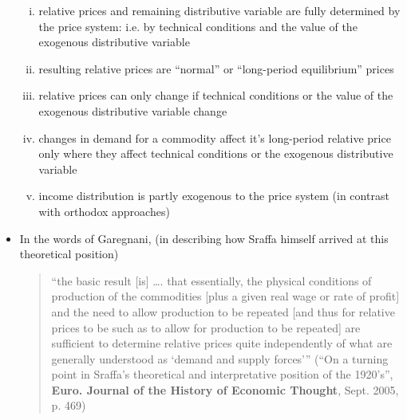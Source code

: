 \documentclass{article}
\begin{document}
\begin{itemize}
\begin{enumerate}[(i)]
			\item relative prices and remaining distributive variable are fully determined by the price system: i.e. by technical conditions and the value of the exogenous distributive variable 
			\item resulting relative prices are ``normal'' or ``long-period equilibrium'' prices
			\item relative prices can only change if technical conditions or the value of the exogenous distributive variable change
			\item changes in demand for a commodity affect it's long-period relative price only where they affect technical conditions or the exogenous distributive variable
			\item income distribution is partly exogenous to the price system  (in contrast with orthodox approaches)
		\end{enumerate}
		\item In the words of Garegnani, (in describing how Sraffa himself arrived at this theoretical position)
		\begin{quote}
			“the basic result [is] …. that essentially, the physical conditions of production of the commodities [plus a given real wage or rate of profit] and the need to allow production to be repeated [and thus for relative prices to be such as to allow for production to be repeated] are sufficient to determine relative prices quite independently of what are generally understood as `demand and supply forces'''  (“On a turning point in Sraffa's theoretical and interpretative position of the 1920's'', \textbf{Euro. Journal of the History of Economic Thought}, Sept. 2005, p. 469)
		\end{quote}
	\end{itemize}
\end{document}
